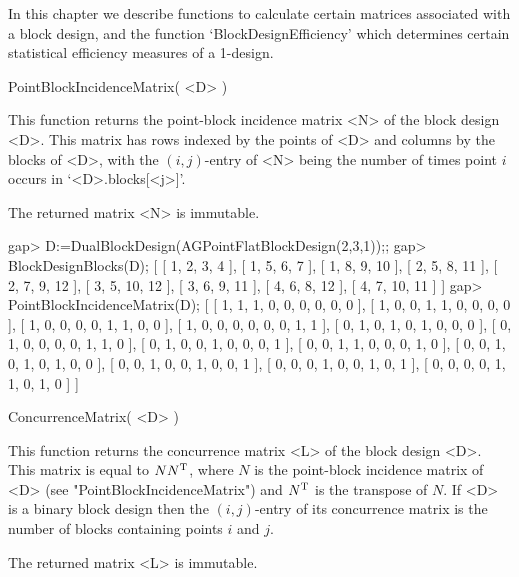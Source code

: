 %
%
%
%
\def\DESIGN{\sf DESIGN}
\def\GRAPE{\sf GRAPE}
\def\nauty{\it nauty}
\def\Aut{{\rm Aut}\,}
\def\x{\times}

In this chapter we describe functions to calculate certain matrices
associated with a block design, and the function `BlockDesignEfficiency'
which determines certain statistical efficiency measures of a 1-design.


\>PointBlockIncidenceMatrix( <D> )

This function returns the point-block incidence matrix <N> of the
block design <D>.  This matrix has rows indexed by the points of <D>
and columns by the blocks of <D>, with the $(i,j)$-entry of <N> being
the number of times point $i$ occurs in `<D>.blocks[<j>]'.

The returned matrix <N> is immutable. 

\beginexample
gap> D:=DualBlockDesign(AGPointFlatBlockDesign(2,3,1));;
gap> BlockDesignBlocks(D);
[ [ 1, 2, 3, 4 ], [ 1, 5, 6, 7 ], [ 1, 8, 9, 10 ], [ 2, 5, 8, 11 ], 
  [ 2, 7, 9, 12 ], [ 3, 5, 10, 12 ], [ 3, 6, 9, 11 ], [ 4, 6, 8, 12 ], 
  [ 4, 7, 10, 11 ] ]
gap> PointBlockIncidenceMatrix(D);
[ [ 1, 1, 1, 0, 0, 0, 0, 0, 0 ], [ 1, 0, 0, 1, 1, 0, 0, 0, 0 ], 
  [ 1, 0, 0, 0, 0, 1, 1, 0, 0 ], [ 1, 0, 0, 0, 0, 0, 0, 1, 1 ], 
  [ 0, 1, 0, 1, 0, 1, 0, 0, 0 ], [ 0, 1, 0, 0, 0, 0, 1, 1, 0 ], 
  [ 0, 1, 0, 0, 1, 0, 0, 0, 1 ], [ 0, 0, 1, 1, 0, 0, 0, 1, 0 ], 
  [ 0, 0, 1, 0, 1, 0, 1, 0, 0 ], [ 0, 0, 1, 0, 0, 1, 0, 0, 1 ], 
  [ 0, 0, 0, 1, 0, 0, 1, 0, 1 ], [ 0, 0, 0, 0, 1, 1, 0, 1, 0 ] ]
\endexample

\>ConcurrenceMatrix( <D> )

This function returns the concurrence matrix <L> of the block design <D>.
This matrix is equal to $NN^{\rm T}$, where $N$ is the point-block
incidence matrix of <D> (see "PointBlockIncidenceMatrix") and 
$N^{\rm T}$ is the transpose of $N$. If <D> is a binary block design
then the $(i,j)$-entry of its concurrence matrix is the number of blocks
containing points $i$ and $j$.

The returned matrix <L> is immutable.

